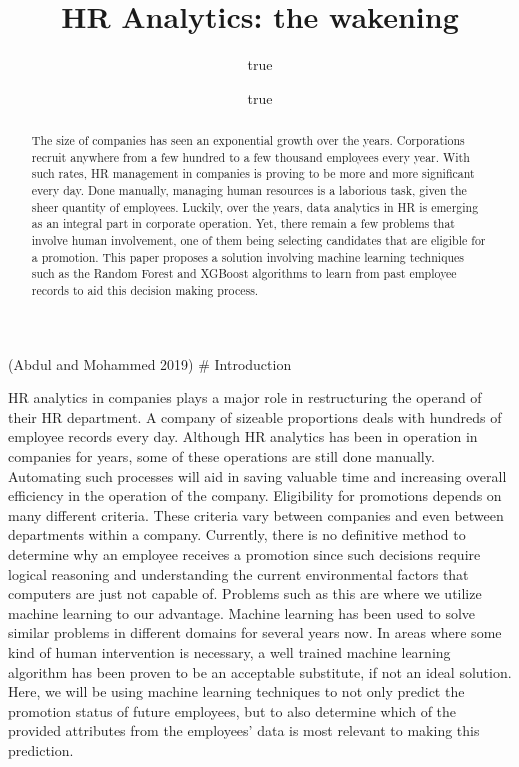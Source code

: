 \documentclass[
]{article}
\title{\textbf{HR Analytics: the wakening}}
\author{true \and true}
\date{}
\begin{document}
\maketitle
\begin{abstract}
The size of companies has seen an exponential growth over the years.
Corporations recruit anywhere from a few hundred to a few thousand
employees every year. With such rates, HR management in companies is
proving to be more and more significant every day. Done manually,
managing human resources is a laborious task, given the sheer quantity
of employees. Luckily, over the years, data analytics in HR is emerging
as an integral part in corporate operation. Yet, there remain a few
problems that involve human involvement, one of them being selecting
candidates that are eligible for a promotion. This paper proposes a
solution involving machine learning techniques such as the Random Forest
and XGBoost algorithms to learn from past employee records to aid this
decision making process.
\end{abstract}

(Abdul and Mohammed 2019) \# Introduction

HR analytics in companies plays a major role in restructuring the
operand of their HR department. A company of sizeable proportions deals
with hundreds of employee records every day. Although HR analytics has
been in operation in companies for years, some of these operations are
still done manually. Automating such processes will aid in saving
valuable time and increasing overall efficiency in the operation of the
company. Eligibility for promotions depends on many different criteria.
These criteria vary between companies and even between departments
within a company. Currently, there is no definitive method to determine
why an employee receives a promotion since such decisions require
logical reasoning and understanding the current environmental factors
that computers are just not capable of. Problems such as this are where
we utilize machine learning to our advantage. Machine learning has been
used to solve similar problems in different domains for several years
now. In areas where some kind of human intervention is necessary, a well
trained machine learning algorithm has been proven to be an acceptable
substitute, if not an ideal solution. Here, we will be using machine
learning techniques to not only predict the promotion status of future
employees, but to also determine which of the provided attributes from
the employees' data is most relevant to making this prediction.
\end{document}

